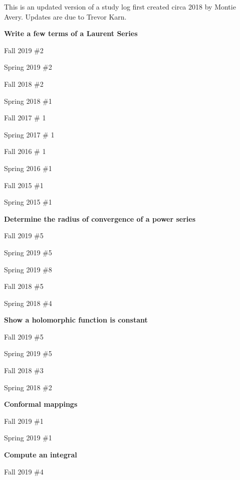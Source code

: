 \documentclass{article}
\begin{document}
\noindent This is an updated version of a study log first created circa 2018 by Montie Avery.
Updates are due to Trevor Karn.

\hfill

\textbf{Write a few terms of a Laurent Series}
\begin{todolist}
	\item Fall 2019 \#2
	\item Spring 2019 \#2
	\item Fall 2018 \#2
	\item Spring 2018 \#1
	\item Fall 2017 \# 1
	\item Spring 2017 \# 1
	\item Fall 2016 \# 1
	\item Spring 2016 \#1
	\item Fall 2015 \#1 
	\item Spring 2015 \#1
\end{todolist}

\textbf{Determine the radius of convergence of a power series}
\begin{todolist}
	\item Fall 2019 \#5
	\item Spring 2019 \#5
	\item Spring 2019 \#8
	\item Fall 2018 \#5
	\item Spring 2018 \#4
\end{todolist}

\textbf{Show a holomorphic function is constant}
\begin{todolist}
	\item Fall 2019 \#5
	\item Spring 2019 \#5
	\item Fall 2018 \#3
	\item Spring 2018 \#2
\end{todolist}

\textbf{Conformal mappings}
\begin{todolist}
	\item Fall 2019 \#1
	\item Spring 2019 \#1
\end{todolist}

\textbf{Compute an integral}
\begin{todolist}
	\item Fall 2019 \#4
\end{todolist}
\end{document}
